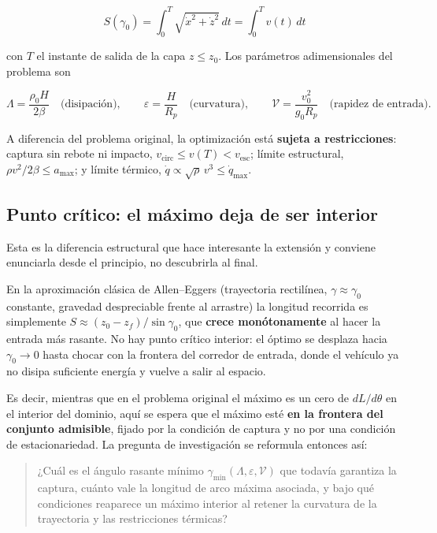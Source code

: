 \[
\boxed{\;
S(\gamma_0)=\int_0^{T}\sqrt{\dot x^2+\dot z^2}\,dt=\int_0^{T}v(t)\,dt
\;}
\]

con \(T\) el instante de salida de la capa \(z\leq z_0\). Los parámetros adimensionales del problema son

\[
\Lambda=\frac{\rho_0H}{2\beta}
\quad\text{(disipación)},
\qquad
\varepsilon=\frac{H}{R_p}
\quad\text{(curvatura)},
\qquad
\mathcal{V}=\frac{v_0^2}{g_0R_p}
\quad\text{(rapidez de entrada)}.
\]

A diferencia del problema original, la optimización está \textbf{sujeta a restricciones}: captura sin rebote ni impacto, \(v_{\text{circ}}\leq v(T)<v_{\text{esc}}\); límite estructural, \(\rho v^2/2\beta\leq a_{\max}\); y límite térmico, \(\dot q\propto\sqrt{\rho}\,v^3\leq\dot q_{\max}\).

\subsection{Punto crítico: el máximo deja de ser interior}

Esta es la diferencia estructural que hace interesante la extensión y conviene enunciarla desde el principio, no descubrirla al final.

En la aproximación clásica de Allen--Eggers (trayectoria rectilínea, \(\gamma\approx\gamma_0\) constante, gravedad despreciable frente al arrastre) la longitud recorrida es simplemente \(S\approx(z_0-z_f)/\sin\gamma_0\), que \textbf{crece monótonamente} al hacer la entrada más rasante. No hay punto crítico interior: el óptimo se desplaza hacia \(\gamma_0\to0\) hasta chocar con la frontera del corredor de entrada, donde el vehículo ya no disipa suficiente energía y vuelve a salir al espacio.

Es decir, mientras que en el problema original el máximo es un cero de \(dL/d\theta\) en el interior del dominio, aquí se espera que el máximo esté \textbf{en la frontera del conjunto admisible}, fijado por la condición de captura y no por una condición de estacionariedad. La pregunta de investigación se reformula entonces así:

\begin{quote}
¿Cuál es el ángulo rasante mínimo \(\gamma_{\min}(\Lambda,\varepsilon,\mathcal{V})\) que todavía garantiza la captura, cuánto vale la longitud de arco máxima asociada, y bajo qué condiciones reaparece un máximo interior al retener la curvatura de la trayectoria y las restricciones térmicas?
\end{quote}

